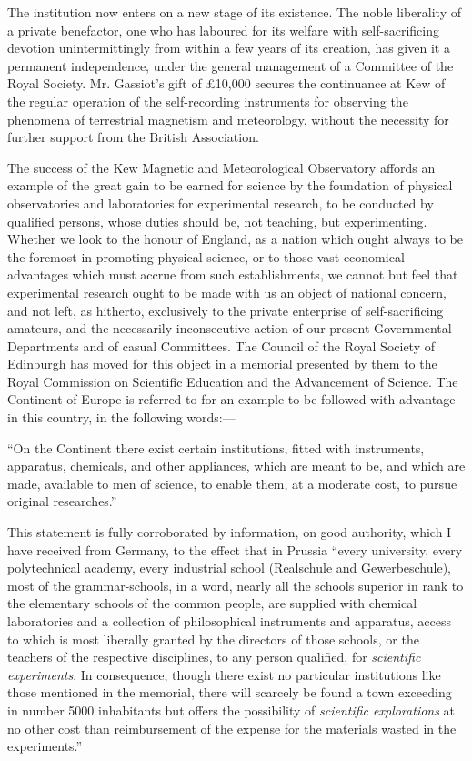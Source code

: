 \documentclass[a4paper, 11pt, oneside, english]{article}
\begin{document}
The institution now enters on a new stage of its existence. The noble liberality of a private benefactor, one who has laboured for its welfare with self-sacrificing devotion unintermittingly from within a few years of its creation, has given it a permanent independence, under the general management of a Committee of the Royal Society. Mr. Gassiot's gift of £10,000 secures the continuance at Kew of the regular operation of the self-recording instruments for observing the phenomena of terrestrial magnetism and meteorology, without the necessity for further support from the British Association.

The success of the Kew Magnetic and Meteorological Observatory affords an example of the great gain to be earned for science by the foundation of physical observatories and laboratories for experimental research, to be conducted by qualified persons, whose duties should be, not teaching, but experimenting. Whether we look to the honour of England, as a nation which ought always to be the foremost in promoting physical science, or to those vast economical advantages which must accrue from such establishments, we cannot but feel that experimental research ought to be made with us an object of national concern, and not left, as hitherto, exclusively to the private enterprise of self-sacrificing amateurs, and the necessarily inconsecutive action of our present Governmental Departments and of casual Committees. The Council of the Royal Society of Edinburgh has moved for this object in a memorial presented by them to the Royal Commission on Scientific Education and the Advancement of Science. The Continent of Europe is referred to for an example to be followed with advantage in this country, in the following words:---

``On the Continent there exist certain institutions, fitted with instruments, apparatus, chemicals, and other appliances, which are meant to be, and which are made, available to men of science, to enable them, at a moderate cost, to pursue original researches.''

This statement is fully corroborated by information, on good authority, which I have received from Germany, to the effect that in Prussia ``every university, every polytechnical academy, every industrial school (Realschule and Gewerbeschule), most of the grammar-schools, in a word, nearly all the schools superior in rank to the elementary schools of the common people, are supplied with chemical laboratories and a collection of philosophical instruments and apparatus, access to which is most liberally granted by the directors of those schools, or the teachers of the respective disciplines, to any person qualified, for \emph{scientific experiments}. In consequence, though there exist no particular institutions like those mentioned in the memorial, there will scarcely be found a town exceeding in number 5000 inhabitants but offers the possibility of \emph{scientific explorations} at no other cost than reimbursement of the expense for the materials wasted in the experiments.''
\end{document}
